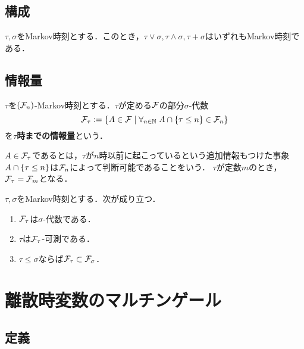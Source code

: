 \documentclass[uplatex,dvipdfmx]{jsreport}
\begin{document}
\subsection{構成}

\begin{theorem}[Markov時刻の構成]
    $\tau,\sigma$をMarkov時刻とする．このとき，$\tau\lor\sigma,\tau\land\sigma,\tau+\sigma$はいずれもMarkov時刻である．
\end{theorem}

\subsection{情報量}

\begin{definition}
    $\tau$を$(\mathcal{F}_n)$-Markov時刻とする．$\tau$が定める$\mathcal{F}$の部分$\sigma$-代数
    \[\mathcal{F}_\tau:=\left\{A\in\mathcal{F}\mid\forall_{n\in\mathbb{N}}\;A\cap\left\{\tau\le n\right\}\in\mathcal{F}_n\right\}\]
    を\textbf{$\tau$時までの情報量}という．
\end{definition}
\begin{remarks}
    $A\in\mathcal{F}_\tau$であるとは，$\tau$が$n$時以前に起こっているという追加情報もつけた事象$A\cap\left\{\tau\le n\right\}$は$\mathcal{F}_n$によって判断可能であることをいう．
    $\tau$が定数$m$のとき，$\mathcal{F}_\tau=\mathcal{F}_m$となる．
\end{remarks}

\begin{theorem}
    $\tau,\sigma$をMarkov時刻とする．次が成り立つ．
    \begin{enumerate}
        \item $\mathcal{F}_\tau$は$\sigma$-代数である．
        \item $\tau$は$\mathcal{F}_\tau$-可測である．
        \item $\tau\le\sigma$ならば$\mathcal{F}_\tau\subset\mathcal{F}_\sigma$．
    \end{enumerate}
\end{theorem}

\section{離散時変数のマルチンゲール}

\subsection{定義}
\end{document}
